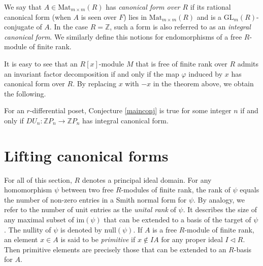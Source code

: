 \documentclass[ALCO, Unicode]{cedram}
\newcommand{\ZZ}{\mathbb{Z}}
\newcommand{\GL}{\mathrm{GL}}
\begin{document}
\begin{definition} We say that $ A \in \mathrm{Mat}_{m \times m }(R) $ has \emph{canonical form over $ R $}     if its rational canonical form (when $ A $ is seen over $ F$) lies in $ \mathrm{Mat}_{m \times m }(R) $ and is a $ \GL_{m}(R) $-conjugate of $ A $. In the case $ R = \ZZ $, such a form is also  referred to as an \emph{integral canonical form}.    
We similarly define this notions for endomorphisms of a  free $ R  $-module of finite rank.   \end{definition}                        
It is easy to see that an $ R[x]$-module $ M $ that is free of finite rank over $ R $ admits an invariant factor decomposition if and only if the map $ \varphi $ induced by $ x $  has canonical form over $ R $. By replacing $ x $ with $-x $ in the theorem above, we obtain  the following.                                                                                                                        
\begin{corollary}  \label{RCFEquivMiller}  For  an  $ r $-differential poset, Conjecture \ref{mainconj} is true for some integer  $ n $ if and only if  
$ DU_{n} : \ZZ P_{n} \to \ZZ  P_{n}    $  
has  integral  canonical form.     
\end{corollary}





\section{Lifting canonical forms}  

For all of this section, $  R $ denotes  a  principal ideal domain. For any homomorphism $ \psi $ between two free $R$-modules of finite rank,  the rank of $  \psi $ equals the number of non-zero entries in a Smith normal form for $ \psi $.  By analogy, we refer to the number of unit entries as the  \emph{unital  rank} of $ \psi $. It describes the  size of any maximal subset  of  $ \mathrm{im}(\psi) $ that can be extended to a basis of the target of  $ \psi $. The nullity of $ \psi $ is denoted by $ \mathrm{null}(\psi) $.       %
If $ A $ is a free $R$-module of finite rank, an element $ x \in A $ is said to be \emph{primitive} if $ x \notin IA $ for any proper ideal $ I \triangleleft R $.  Then primitive elements are precisely those that can be extended to an $ R$-basis for   $A $.   
\end{document}
